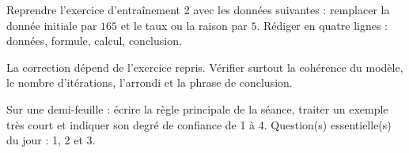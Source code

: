 
\begin{homework}Reprendre l'exercice d'entraînement 2 avec les données suivantes : remplacer la donnée initiale par $165$ et le taux ou la raison par $5$. Rédiger en quatre lignes : données, formule, calcul, conclusion.\end{homework}
\begin{solution}La correction dépend de l'exercice repris. Vérifier surtout la cohérence du modèle, le nombre d'itérations, l'arrondi et la phrase de conclusion.\end{solution}

\begin{exitticket}[3 minutes]Sur une demi-feuille : écrire la règle principale de la séance, traiter un exemple très court et indiquer son degré de confiance de 1 à 4. Question(s) essentielle(s) du jour : 1, 2 et 3.\end{exitticket}

